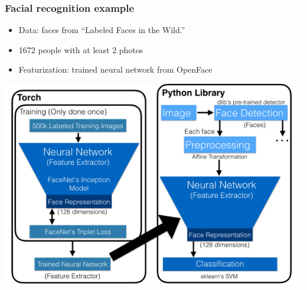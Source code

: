 \documentclass{beamer}
\begin{document}
\begin{frame}
\frametitle{Facial recognition example}
\begin{itemize}
\item Data: faces from ``Labeled Faces in the Wild.''
\item 1672 people with at least 2 photos
\item Featurization: trained neural network from OpenFace
\end{itemize}
\begin{center}
\includegraphics[scale = 0.3]{openface_struc.png}
\end{center}
\end{frame}
\end{document}
